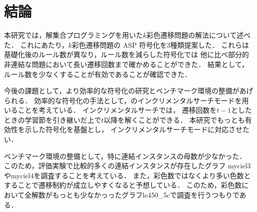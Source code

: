 \chapter{結論} \label{chap:conclusion}
本研究では，解集合プログラミングを用いた$k$彩色遷移問題の解法について述べた．
これにあたり，$k$彩色遷移問題の ASP 符号化を3種類提案した．
これらは基礎化後のルール数が異なり，ルール数を減らした符号化では
他に比べ部分的非連結な問題において長い遷移回数まで確かめることができた．
結果として，ルール数を少なくすることが有効であることが確認できた．

今後の課題として，より効率的な符号化の研究とベンチマーク環境の整備があげられる．
効率的な符号化の手法として，{\clingo}のインクリメンタルサーチモードを用いることを考えている．
インクリメンタルサーチでは，
遷移回数を$t-1$としたときの学習節を引き継いだ上で$t$以降を解くことができる．
本研究でもっとも有効性を示した符号化を基盤とし，
インクリメンタルサーチモードに対応させたい．

ベンチマーク環境の整備として，特に連結インスタンスの母数が少なかった．
このため，評価実験で比較的多くの連結インスタンスが存在したグラフ
myciel3やmyciel4を調査することを考えている．
また，彩色数ではなくより多い色数とすることで遷移制約が成立しやすくなると予想している．
このため，彩色数において全解数がもっとも少なかっったグラフle450\_5cで調査を行うつもりである．


